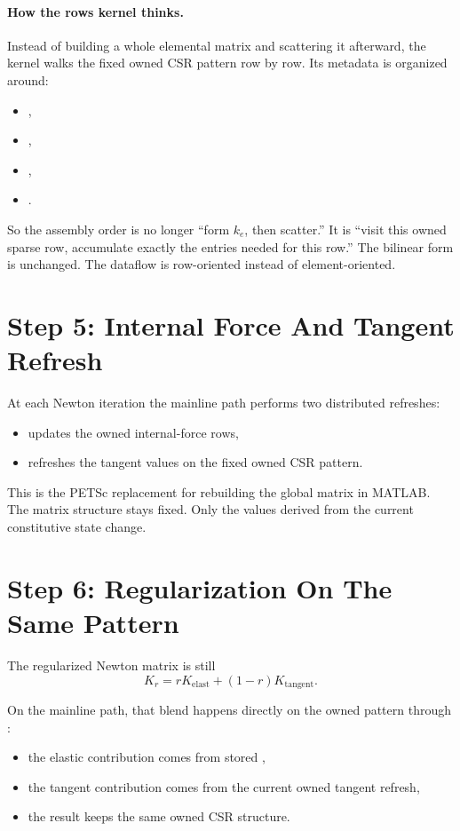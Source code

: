 \paragraph{How the rows kernel thinks.}
Instead of building a whole elemental matrix and scattering it afterward, the
kernel walks the fixed owned CSR pattern row by row. Its metadata is organized
around:
\begin{itemize}
\item {},
\item {},
\item {},
\item {}.
\end{itemize}

So the assembly order is no longer ``form \(k_e\), then scatter.'' It is
``visit this owned sparse row, accumulate exactly the entries needed for this
row.'' The bilinear form is unchanged. The dataflow is row-oriented instead of
element-oriented.

\section{Step 5: Internal Force And Tangent Refresh}

At each Newton iteration the mainline path performs two distributed refreshes:
\begin{itemize}
\item {} updates the owned
internal-force rows,
\item {} refreshes the tangent values
on the fixed owned CSR pattern.
\end{itemize}

This is the PETSc replacement for rebuilding the global
 matrix in MATLAB. The matrix structure stays fixed. Only
the values derived from the current constitutive state change.

\section{Step 6: Regularization On The Same Pattern}

The regularized Newton matrix is still
\[
K_r = r K_{\mathrm{elast}} + (1-r) K_{\mathrm{tangent}}.
\]

On the mainline path, that blend happens directly on the owned pattern through
:
\begin{itemize}
\item the elastic contribution comes from stored ,
\item the tangent contribution comes from the current owned tangent refresh,
\item the result keeps the same owned CSR structure.
\end{itemize}

